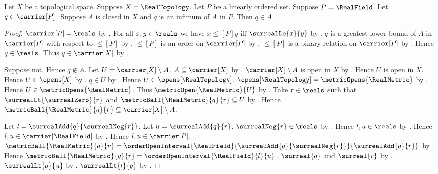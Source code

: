 \begin{theorem}\label{closed_real_set_contains_infimum}
    Let $X$ be a topological space.
    Suppose $X=\RealTopology$.
    Let $P$ be a linearly ordered set.
    Suppose $P=\RealField$.
    Let $q\in\carrier[P]$.
    Suppose $A$ is closed in $X$ and $q$ is an infimum of $A$ in $P$.
    Then $q\in A$.
\end{theorem}
\begin{proof}
    $\carrier[P]=\reals$ by
        .
    For all $x,y\in\reals$ we have
        $x\mathrel{\leq[P]}y$ iff $\surrealLe{x}{y}$ by
        .
    $q$ is a greatest lower bound of $A$ in $\carrier[P]$
        with respect to $\leq[P]$ by .
    $\leq[P]$ is an order on $\carrier[P]$ by
        .
    $\leq[P]$ is a binary relation on $\carrier[P]$ by
        .
    Hence $q\in\reals$.
    Thus $q\in\carrier[X]$ by .

    Suppose not.
    Hence $q\notin A$.
    Let $U=\carrier[X]\setminus A$.
    $A\subseteq\carrier[X]$ by .
    $\carrier[X]\setminus A$ is open in $X$ by
        .
    Hence $U$ is open in $X$.
    Hence $U\in\opens[X]$ by .
    $q\in U$ by .
    Hence $U\in\opens[\RealTopology]$.
    $\opens[\RealTopology]=\metricOpens{\RealMetric}$ by
        .
    Hence $U\in\metricOpens{\RealMetric}$.
    Thus $\metricOpen{\RealMetric}{U}$ by .
    Take $r\in\reals$ such that $\surrealLt{\surrealZero}{r}$ and
        $\metricBall{\RealMetric}{q}{r}\subseteq U$ by
        .
    Hence $\metricBall{\RealMetric}{q}{r}
        \subseteq\carrier[X]\setminus A$.

    Let $l=\surrealAdd{q}{\surrealNeg{r}}$.
    Let $u=\surrealAdd{q}{r}$.
    $\surrealNeg{r}\in\reals$ by
        .
    Hence $l,u\in\reals$ by .
    Hence $l,u\in\carrier[\RealField]$ by
        .
    Hence $l,u\in\carrier[P]$.
    $\metricBall{\RealMetric}{q}{r}
        =\orderOpenInterval{\RealField}
            {\surrealAdd{q}{\surrealNeg{r}}}{\surrealAdd{q}{r}}$ by
        .
    Hence $\metricBall{\RealMetric}{q}{r}
        =\orderOpenInterval{\RealField}{l}{u}$.
    $\surreal{q}$ and $\surreal{r}$ by
        .
    $\surrealLt{q}{u}$ by
        .
    $\surrealLt{l}{q}$ by
        .


\end{proof}

